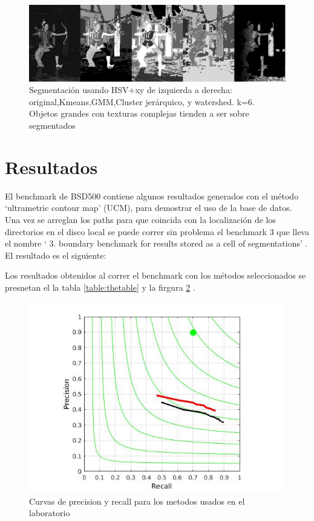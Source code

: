 \documentclass[10pt,twocolumn,letterpaper]{article}
\begin{document}
\begin{figure}
\begin{center}
\includegraphics[width=0.95\linewidth]
                 {img/woman.jpg}
\end{center}
 \caption{Segmentación usando HSV+xy de izquierda a derecha: original,Kmeans,GMM,Cluster jerárquico, y watershed. k=6. Objetos grandes con texturas complejas tienden a ser sobre segmentados}
\label{fig:woman}
\end{figure}


\section{Resultados}

El benchmark de BSD500 contiene algunos resultados generados con el método ‘ultrametric contour map’ (UCM), para demostrar el uso de la base de datos. Una vez se arreglan los paths para que coincida con la localización de los directorios en el disco local se puede correr sin problema el benchmark 3 que lleva el nombre ‘ 3. boundary benchmark for results stored as a cell of segmentations’ . El resultado es el siguiente:


Los resultados obtenidos al correr el benchmark con los métodos seleccionados se presnetan el la tabla \ref{table:thetable} y la firgura \ref{fig:plot} .


\begin{figure}
\begin{center}
\includegraphics[width=1.15\linewidth]
                 {img/metods.jpg}
\end{center}
 \caption{Curvas de precision y recall para los metodos usados en el laboratorio}
\label{fig:plot}
\end{figure}
\end{document}
